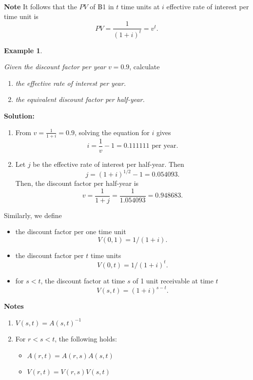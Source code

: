 \documentclass[
]{book}
\theoremstyle{definition}
\theoremstyle{definition}
\newtheorem{example}{Example}[chapter]
\theoremstyle{definition}
\theoremstyle{definition}
\theoremstyle{remark}
\begin{document}
\textbf{Note} It follows that the \(PV\) of ฿1 in \(t\) time units at \(i\)
effective rate of interest per time unit is
\[PV = \frac{1}{(1+i)^t} = v^t.\]

\begin{example}
\protect\hypertarget{exm:unlabeled-div-23}{}\label{exm:unlabeled-div-23}

\emph{Given the discount factor per year} \(v = 0.9\), calculate

\begin{enumerate}
\def\labelenumi{\arabic{enumi}.}
\item
  \emph{the effective rate of interest per year.}
\item
  \emph{the equivalent discount factor per half-year.}
\end{enumerate}

\end{example}

\textbf{Solution:}

\begin{enumerate}
\def\labelenumi{\arabic{enumi}.}
\item
  From \(\displaystyle{ v= \frac{1}{1+i} = 0.9}\), solving the equation
  for \(i\) gives \[i = \frac{1}{v} - 1 = 0.111111 \text{ per year}.\]
\item
  Let \(j\) be the effective rate of interest per half-year. Then
  \[j = (1+ i)^{1/2} -1 = 0.054093.\] Then, the discount factor per
  half-year is \[v = \frac{1}{1+j} = \frac{1}{1.054093} = 0.948683.\]
\end{enumerate}

Similarly, we define

\begin{itemize}
\item
  the discount factor per one time unit \[V(0,1) = 1/(1 + i).\]
\item
  the discount factor per \(t\) time units \[V(0,t) = 1/(1 + i)^t.\]
\item
  for \(s < t\), the discount factor at time \(s\) of 1 unit receivable at
  time \(t\) \[V(s,t) =  (1 + i)^{s - t}.\]
\end{itemize}

\textbf{Notes}

\begin{enumerate}
\def\labelenumi{\arabic{enumi}.}
\item
  \(V(s,t) = A(s,t)^{-1}\)
\item
  For \(r < s < t\), the following holds:

  \begin{itemize}
  \item
    \(A(r,t) = A(r,s) A(s,t)\)
  \item
    \(V(r,t) = V(r,s) V(s,t)\)
  \end{itemize}
\end{enumerate}
\end{document}
